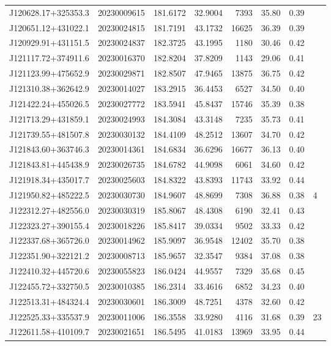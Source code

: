 \documentclass{article}
\begin{document}
\begin {longtable}{|l|l|r|r|r|r|r|l|}
 J120628.17+325353.3&  20230009615&  181.6172&   32.9004&  7393& 35.80& 0.39&\\
 J120651.12+431022.1&  20230024815&  181.7191&   43.1732& 16625& 36.39& 0.39&\\
 J120929.91+431151.5&  20230024837&  182.3725&   43.1995&  1180& 30.46& 0.42&\\
 J121117.72+374911.6&  20230016370&  182.8204&   37.8209&  1143& 29.06& 0.41&\\
 J121123.99+475652.9&  20230029871&  182.8507&   47.9465& 13875& 36.75& 0.42&\\
 J121310.38+362642.9&  20230014027&  183.2915&   36.4453&  6527& 34.50& 0.40&\\
 J121422.24+455026.5&  20230027772&  183.5941&   45.8437& 15746& 35.39& 0.38&\\
 J121713.29+431859.1&  20230024993&  184.3084&   43.3148&  7235& 35.73& 0.41&\\
 J121739.55+481507.8&  20230030132&  184.4109&   48.2512& 13607& 34.70& 0.42&\\
 J121843.60+363746.3&  20230014361&  184.6834&   36.6296& 16677& 36.13& 0.40&\\
 J121843.81+445438.9&  20230026735&  184.6782&   44.9098&  6061& 34.60& 0.42&\\
 J121918.34+435017.7&  20230025603&  184.8322&   43.8393& 11743& 33.92& 0.44&\\
 J121950.82+485222.5&  20230030730&  184.9607&   48.8699&  7308& 36.88& 0.38&4\\
 J122312.27+482556.0&  20230030319&  185.8067&   48.4308&  6190& 32.41& 0.43&\\
 J122323.27+390155.4&  20230018226&  185.8417&   39.0334&  9502& 33.33& 0.42&\\
 J122337.68+365726.0&  20230014962&  185.9097&   36.9548& 12402& 35.70& 0.38&\\
 J122351.90+322121.2&  20230008713&  185.9657&   32.3547&  9384& 37.08& 0.38&\\
 J122410.32+445720.6&  20230055823&  186.0424&   44.9557&  7329& 35.68& 0.45&\\
 J122455.72+332750.5&  20230010385&  186.2314&   33.4616&  6852& 34.23& 0.40&\\
 J122513.31+484324.4&  20230030601&  186.3009&   48.7251&  4378& 32.60& 0.42&\\
 J122525.33+335537.9&  20230011006&  186.3558&   33.9280&  4116& 31.68& 0.39&23\\
 J122611.58+410109.7&  20230021651&  186.5495&   41.0183& 13969& 33.95& 0.44&\\

\end{longtable}
\end{document}
